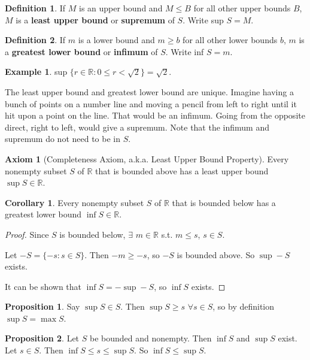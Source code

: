 \documentclass{article}
\theoremstyle{definition}
\newtheorem{definition}{Definition}[section]
\newtheorem{example}{Example}[section]
\newtheorem{proposition}{Proposition}[section]
\newtheorem{axiom}{Axiom}[section]
\newtheorem{corollary}{Corollary}[section]
\begin{document}
\begin{definition}
If $M$ is an upper bound and $M \leq B$ for all other upper bounds $B$, $M$ is a \textbf{least upper bound} or \textbf{supremum} of $S$. Write sup $S = M$.
\end{definition}

\begin{definition}
If $m$ is a lower bound and $m \geq b$ for all other lower bounds $b$, $m$ is a \textbf{greatest lower bound} or \textbf{infimum} of $S$. Write inf $S = m$.
\end{definition}

\begin{example}
sup $\{r \in \mathbb{R} : 0 \leq r < \sqrt{2}\} = \sqrt{2}$.
\end{example}

The least upper bound and greatest lower bound are unique. Imagine having a bunch of points on a number line and moving a pencil from left to right until it hit upon a point on the line. That would be an infimum. Going from the opposite direct, right to left, would give a supremum. Note that the infimum and supremum do not need to be in $S$.

\begin{axiom}[Completeness Axiom, a.k.a. Least Upper Bound Property]
Every nonempty subset $S$ of $\mathbb{R}$ that is bounded above has a least upper bound $\sup S \in\mathbb{R}$.
\end{axiom}

\begin{corollary}
Every nonempty subset $S$ of $\mathbb{R}$ that is bounded below has a greatest lower bound $\inf S \in\mathbb{R}$.
\end{corollary}

\begin{proof}
Since $S$ is bounded below, $\exists$ $m \in \mathbb{R}$ s.t. $m \leq s$, $s \in S$.

Let $-S = \{ -s : s \in S \}$. Then $-m \ge -s$, so $-S$ is bounded above. So $\sup -S$ exists.

It can be shown that $\inf S = - \sup -S$, so $\inf S$ exists.

\end{proof}

\begin{proposition}
Say $\sup S \in S$. Then $\sup S \ge s$ $\forall s \in S$, so by definition $\sup S = \max S$.
\end{proposition}

\begin{proposition} \label{bound-comparison}
Let $S$ be bounded and nonempty. Then $\inf S$ and $\sup S$ exist. Let $s \in S$. Then $\inf S \le s \le \sup S$.
So $\inf S \le \sup S$.
\end{proposition}
\end{document}

